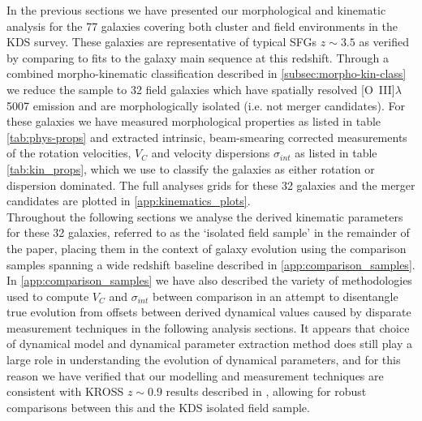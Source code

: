 \documentclass[fleqn,usenatbib]{mn2e}
\begin{document}
In the previous sections we have presented our morphological and kinematic analysis for the 77 galaxies covering both cluster and field environments in the KDS survey.
These galaxies are representative of typical SFGs $z\sim3.5$ as verified by comparing to fits to the galaxy main sequence at this redshift.
Through a combined morpho-kinematic classification described in \cref{subsec:morpho-kin-class} we reduce the sample to 32 field galaxies which have spatially resolved [O~{\sc III}]$\lambda$5007 emission and are morphologically isolated (i.e. not merger candidates).
For these galaxies we have measured morphological properties as listed in table \ref{tab:phys-props} and extracted intrinsic, beam-smearing corrected measurements of the rotation velocities, $V_{C}$ and velocity dispersions $\sigma_{int}$ as listed in table \ref{tab:kin_props}, which we use to classify the galaxies as either rotation or dispersion dominated.
The full analyses grids for these 32 galaxies and the merger candidates are plotted in \cref{app:kinematics_plots}. \\

Throughout the following sections we analyse the derived kinematic parameters for these 32 galaxies, referred to as the `isolated field sample' in the remainder of the paper, placing them in the context of galaxy evolution using the comparison samples spanning a wide redshift baseline described in \cref{app:comparison_samples}.
In \cref{app:comparison_samples} we have also described the variety of methodologies used to compute $V_{C}$ and $\sigma_{int}$ between comparison in an attempt to disentangle true evolution from offsets between derived dynamical values caused by disparate measurement techniques in the following analysis sections.
It appears that choice of dynamical model and dynamical parameter extraction method does still play a large role in understanding the evolution of dynamical parameters, and for this reason we have verified that our modelling and measurement techniques are consistent with KROSS $z\sim0.9$ results described in \cite{Harrison2017}, allowing for robust comparisons between this and the KDS isolated field sample. 
\end{document}
